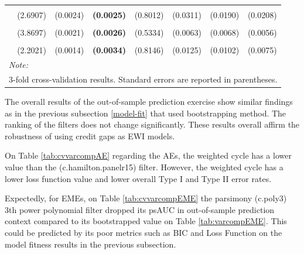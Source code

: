 \documentclass[
  12pt,
]{article}
\begin{document}
\begin{table}[H]
{\begin{tabular}[t]{lll>{}lllll}
\addlinespace
\cellcolor{gray!6}{c.stm.r15} & \cellcolor{gray!6}{-66.3874} & \cellcolor{gray!6}{0.6530} & \textbf{\cellcolor{gray!6}{0.5879}} & \cellcolor{gray!6}{2.4833} & \cellcolor{gray!6}{0.4742} & \cellcolor{gray!6}{0.3179} & \cellcolor{gray!6}{0.3272}\\
 & (2.6907) & (0.0024) & \textbf{(0.0025)} & (0.8012) & (0.0311) & (0.0190) & (0.0208)\\
\addlinespace
\cellcolor{gray!6}{c.stm} & \cellcolor{gray!6}{-84.2480} & \cellcolor{gray!6}{0.6500} & \textbf{\cellcolor{gray!6}{0.5879}} & \cellcolor{gray!6}{2.3616} & \cellcolor{gray!6}{0.4767} & \cellcolor{gray!6}{0.3250} & \cellcolor{gray!6}{0.3330}\\
 & (3.8697) & (0.0021) & \textbf{(0.0026)} & (0.5334) & (0.0063) & (0.0068) & (0.0056)\\
\addlinespace
\cellcolor{gray!6}{c.hp400k.r15} & \cellcolor{gray!6}{-61.6848} & \cellcolor{gray!6}{0.6439} & \textbf{\cellcolor{gray!6}{0.5876}} & \cellcolor{gray!6}{2.6897} & \cellcolor{gray!6}{0.4627} & \cellcolor{gray!6}{0.3226} & \cellcolor{gray!6}{0.3184}\\
 & (2.2021) & (0.0014) & \textbf{(0.0034)} & (0.8146) & (0.0125) & (0.0102) & (0.0075)\\
\bottomrule
\multicolumn{8}{l}{\rule{0pt}{1em}\textit{Note: }}\\
\multicolumn{8}{l}{\rule{0pt}{1em}3-fold cross-validation results. Standard errors are reported in parentheses.}\\
\end{tabular}}
\end{table}

The overall results of the out-of-sample prediction exercise show similar findings as in the previous subsection \ref{model-fit} that used bootstrapping method. The ranking of the filters does not change significantly. These results overall affirm the robustness of using credit gaps as EWI models.

On Table \ref{tab:cvvarcompAE} regarding the AEs, the weighted cycle has a lower value than the (c.hamilton.panelr15) filter. However, the weighted cycle has a lower loss function value and lower overall Type I and Type II error rates.

Expectedly, for EMEs, on Table \ref{tab:cvvarcompEME} the parsimony (c.poly3) 3th power polynomial filter dropped its psAUC in out-of-sample prediction context compared to its bootstrapped value on Table \ref{tab:varcompEME}. This could be predicted by its poor metrics such as BIC and Loss Function on the model fitness results in the previous subsection.
\end{document}

